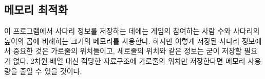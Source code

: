 \documentclass[titlepage]{article}
\begin{document}
\subsection{메모리 최적화}
이 프로그램에서 사다리 정보를 저장하는 데에는 게임의 참여하는 사람 수와 사다리의 높이의 곱에 비례하는 크기의 메모리를 사용한다. 하지만 이렇게 저장된 사다리 정보에서 중요한 것은 가로줄의 위치들이고, 세로줄의 위치와 같은 정보는 굳이 저장할 필요가 없다. 2차원 배열 대신 적당한 자료구조에 가로줄의 위치만 저장한다면 메모리 사용량을 줄일 수 있을 것이다.
\end{document}

